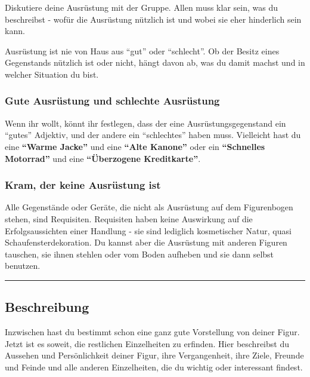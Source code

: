 \documentclass[]{article}
\begin{document}
Diskutiere deine Ausrüstung mit der Gruppe. Allen muss klar sein, was du
beschreibst - wofür die Ausrüstung nützlich ist und wobei sie eher
hinderlich sein kann.

Ausrüstung ist nie von Haus aus ``gut'' oder ``schlecht''. Ob der Besitz
eines Gegenstands nützlich ist oder nicht, hängt davon ab, was du damit
machst und in welcher Situation du bist.

\subsubsection{Gute Ausrüstung und schlechte
Ausrüstung}\label{gute-ausruxfcstung-und-schlechte-ausruxfcstung}

Wenn ihr wollt, könnt ihr festlegen, dass der eine Ausrüstungsgegenstand
ein ``gutes'' Adjektiv, und der andere ein ``schlechtes'' haben muss.
Vielleicht hast du eine \textbf{``Warme Jacke''} und eine \textbf{``Alte
Kanone''} oder ein \textbf{``Schnelles Motorrad''} und eine
\textbf{``Überzogene Kreditkarte''}.

\subsubsection{Kram, der keine Ausrüstung
ist}\label{kram-der-keine-ausruxfcstung-ist}

Alle Gegenstände oder Geräte, die nicht als Ausrüstung auf dem
Figurenbogen stehen, sind Requisiten. Requisiten haben keine Auswirkung
auf die Erfolgsaussichten einer Handlung - sie sind lediglich
kosmetischer Natur, quasi Schaufensterdekoration. Du kannst aber die
Ausrüstung mit anderen Figuren tauschen, sie ihnen stehlen oder vom
Boden aufheben und sie dann selbst benutzen.

\columnsend

\begin{center}\rule{0.5\linewidth}{\linethickness}\end{center}

\subsection{Beschreibung}\label{beschreibung}

Inzwischen hast du bestimmt schon eine ganz gute Vorstellung von deiner
Figur. Jetzt ist es soweit, die restlichen Einzelheiten zu erfinden.
Hier beschreibst du Aussehen und Persönlichkeit deiner Figur, ihre
Vergangenheit, ihre Ziele, Freunde und Feinde und alle anderen
Einzelheiten, die du wichtig oder interessant findest.
\end{document}
